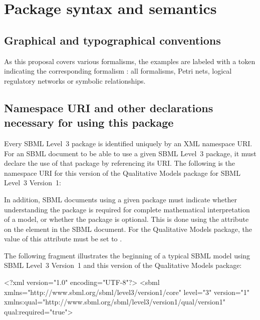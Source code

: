 
\newcommand{\fixttspace}{\hspace*{1pt}}

\section{Package syntax and semantics}

\subsection{Graphical and typographical conventions}

As this proposal covers various formalisms, the examples are labeled with a token indicating the corresponding formalism : \ALL all formalisms, \PN Petri nets, \LRG logical regulatory networks or \SYM symbolic relationships.


\subsection{Namespace URI and other declarations necessary for using this package}
\label{xml-namespace}

Every SBML Level~3 package is identified uniquely by an XML namespace
URI.  For an SBML document to be able to use a given SBML Level~3
package, it must declare the use of that package by referencing its URI.
The following is the namespace URI for this version of the Qualitative Models package for SBML Level~3 Version~1:
\begin{center}
\end{center}

In addition, SBML documents using a given package must indicate whether
understanding the package is required for complete mathematical
interpretation of a model, or whether the package is optional.  This is
done using the attribute  on the  element
in the SBML document.  For the Qualitative Models package,
the value of this attribute must be set to .

The following fragment illustrates the beginning of a typical SBML model
using SBML Level~3 Version~1 and this version of the Qualitative Models package:

\begin{example}
<?xml version="1.0" encoding="UTF-8"?>
<sbml xmlns="http://www.sbml.org/sbml/level3/version1/core" level="3" version="1"
      xmlns:qual="http://www.sbml.org/sbml/level3/version1/qual/version1" qual:required="true">
\end{example}
    

